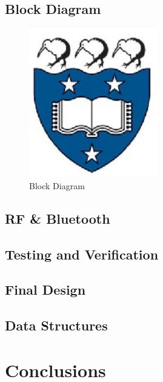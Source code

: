 \documentclass{article}
\begin{document}
\subsection{Block Diagram}

\begin{figure}[!h]
\centerline{\includegraphics[width=0.5\textwidth]{uoa}}
\caption{Block Diagram}
\label{fig:rawFrame}
\end{figure}

\subsection{RF \& Bluetooth}

\subsection{Testing and Verification}

\subsection{Final Design}

\subsection{Data Structures}


\section{Conclusions}
\end{document}
